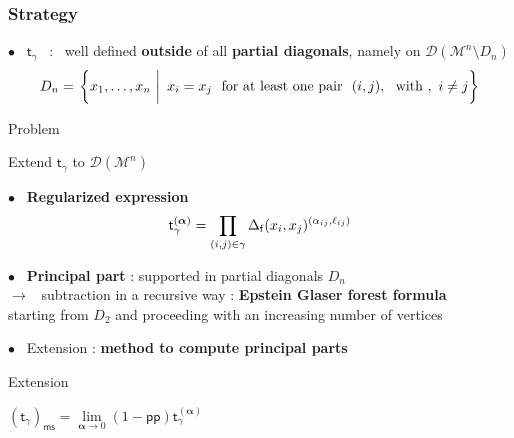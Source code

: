 \documentclass[9pt]{beamer}
\newcommand{\alphabd}{\boldsymbol{\alpha}}
\newcommand{\ms}{\mathsf{ms}}
\newcommand{\pp}{\mathsf{pp}}
\newcommand{\Dcal}{\mathcal{D}}
\newcommand{\Mcal}{\mathcal{M}}
\newcommand{\fsf}{\mathsf{f}}
\newcommand{\tsf}{\mathsf{t}}
\begin{document}


\begin{frame}

\frametitle{Strategy}

\vfill

$\bullet$ \ $\tsf_\gamma$ \ : \ well defined \textbf{outside} of all \textbf{partial diagonals}, namely on $\Dcal(\Mcal^n\setminus D_n)$
%
\vspace*{-5pt}
\begin{equation*}
D_n = \left. \bigg\{x_1, \dots , x_n \ \right| \ x_i = x_j \ \text{ for at least one pair } \  (i,j), \ \mbox{ with } , \ i\neq j \bigg\} 
\vspace*{-20pt}
\end{equation*}
%
\begin{exampleblock}{Problem}
\vspace*{-14pt}
\begin{center}
Extend $\tsf_\gamma$ to $\Dcal(\Mcal^n)$ 
\end{center}
\vspace*{-5pt}
\end{exampleblock}


\vfill

$\bullet$ \ \textbf{Regularized expression} 
%
\vspace*{-7pt}
\begin{equation*}
\tsf^{(\alphabd)}_\gamma = \prod_{(i,j) \in \gamma} \Delta_\fsf(x_i,x_j)^{(\alpha_{ij},\ell_{ij})}
\vspace*{-7pt}
\end{equation*}

$\bullet$ \ \textbf{Principal part} : supported in partial diagonals $D_n$ \\
\hspace*{8pt} $\to$ \ subtraction in a recursive way : \textbf{Epstein Glaser forest formula}\\
\hspace*{24pt} starting from $D_2$ and proceeding with an increasing number of vertices

\vfill

$\bullet$ \ Extension : \textbf{method to compute principal parts}

\vfill

\begin{exampleblock}{Extension}
\vspace*{-14pt}
\begin{center}
$\left(\tsf_\gamma\right)_\ms = \underset{\alphabd \to 0}{\lim} \left(1-\pp\right)\tsf^{(\alphabd)}_\gamma $
\end{center}
\vspace*{-5pt}
\end{exampleblock}

\vfill

\end{frame}
\end{document}

